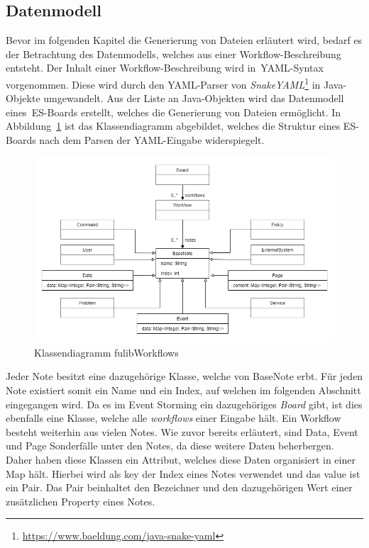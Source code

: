 \subsection{Datenmodell}\label{subsec:datenmodell}
Bevor im folgenden Kapitel die Generierung von Dateien erläutert wird, bedarf es der Betrachtung
des Datenmodells, welches aus einer Workflow-Beschreibung entsteht.
Der Inhalt einer Workflow-Beschreibung wird in~\ac{YAML}-Syntax vorgenommen.
Diese wird durch den YAML-Parser von \textit{SnakeYAML}\footnote{\url{https://www.baeldung.com/java-snake-yaml}} in Java-Objekte umgewandelt.
Aus der Liste an Java-Objekten wird das Datenmodell eines~\ac{ES}-Boards erstellt, welches die Generierung von Dateien ermöglicht.
In Abbildung~\ref{fig:classdiagram} ist das Klassendiagramm abgebildet, welches die Struktur eines \ac{ES}-Boards nach dem Parsen der YAML-Eingabe widerspiegelt.

\begin{figure}[h]
    \centering
    \includegraphics[width=1\textwidth]{images/3.1/classdiagram.drawio}
    \caption{Klassendiagramm fulibWorkflows}
    \label{fig:classdiagram}
\end{figure}

Jeder Note besitzt eine dazugehörige Klasse, welche von BaseNote erbt.
Für jeden Note existiert somit ein Name und ein Index, auf welchen im folgenden Abschnitt eingegangen wird.
Da es im Event Storming ein dazugehöriges \textit{Board} gibt, ist dies ebenfalls eine Klasse, welche alle \textit{workflows} einer Eingabe hält.
Ein Workflow besteht weiterhin aus vielen Notes.
Wie zuvor bereits erläutert, sind Data, Event und Page Sonderfälle unter den Notes, da diese weitere Daten beherbergen.
Daher haben diese Klassen ein Attribut, welches diese Daten organisiert in einer Map hält.
Hierbei wird als key der Index eines Notes verwendet und das value ist ein Pair.
Das Pair beinhaltet den Bezeichner und den dazugehörigen Wert einer zusätzlichen Property eines Notes.
